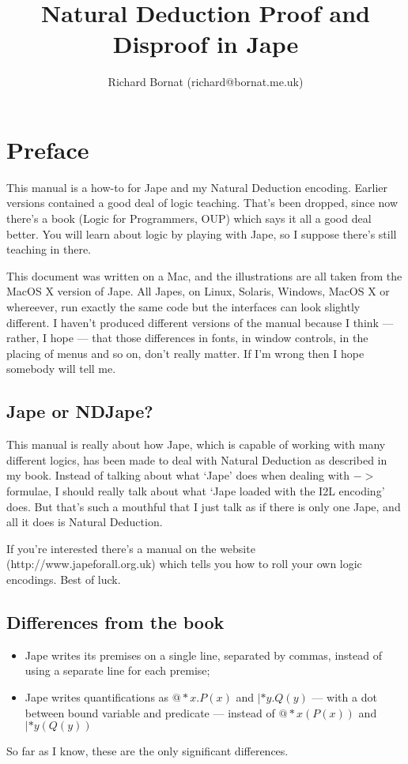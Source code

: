 \documentclass[11pt]{book}
\title{\huge Natural Deduction Proof and Disproof in Jape}
\author{Richard Bornat (richard@bornat.me.uk)}
\begin{document}
\maketitle


\chapter*{Preface}

This manual is a how-to for Jape and my Natural Deduction encoding. Earlier versions contained a good deal of logic teaching. That's been dropped, since now there's a book (Logic for Programmers, OUP) which says it all a good deal better. You will learn about logic by playing with Jape, so I suppose there's still teaching in there.

This document was written on a Mac, and the illustrations are all taken from the MacOS X version of Jape. All Japes, on Linux, Solaris, Windows, MacOS X or whereever, run exactly the same code but the interfaces can look slightly different. I haven't produced different versions of the manual because I think --- rather, I hope --- that those differences in fonts, in window controls, in the placing of menus and so on, don't really matter. If I'm wrong then I hope somebody will tell me.

\section*{Jape or NDJape?}

This manual is really about how Jape, which is capable of working with many different logics, has been made to deal with Natural Deduction as described in my book. Instead of talking about what `Jape' does when dealing with $->$ formulae, I should really talk about what `Jape loaded with the I2L encoding' does. But that's such a mouthful that I just talk as if there is only one Jape, and all it does is Natural Deduction.

If you're interested there's a manual on the website (http://www.japeforall.org.uk) which tells you how to roll your own logic encodings. Best of luck.

\section*{Differences from the book}
\begin{itemize}
\item Jape writes its premises on a single line, separated by commas, instead of using a separate line for each premise;
\item Jape writes quantifications as $@*x.P(x)$ and $|*y.Q(y)$ --- with a dot between bound variable and predicate --- instead of $@*x(P(x))$ and $|*y(Q(y))$
\end{itemize}
So far as I know, these are the only significant differences.
\end{document}
